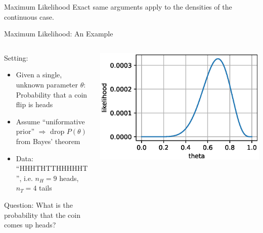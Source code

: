 {\begin{frame}{Maximum Likelihood}
        Exact same arguments apply to the densities of the continuous case.
    \end{frame}

    \begin{frame}{Maximum Likelihood: An Example}
        \begin{columns}[onlytextwidth]
            \begin{column}{0.7\textwidth}
                Setting:
                \begin{itemize}
                    \item Given a single, unknown parameter $\theta$: Probability that a coin flip is heads
                    \item Assume ``uniformative prior'' $\Rightarrow$ drop $P(\theta)$ from Bayes' theorem
                    \item Data: ``HHHTHTTHHHHHT'', i.e. $n_H = 9$ heads, $n_T = 4$ tails
                \end{itemize}
                \vspace*{3mm}

                Question: What is the probability that the coin comes up heads?\\
            \end{column}
            \begin{column}{0.3\textwidth}
                \begin{center}
                    \includegraphics[width=\textwidth]{fig/prob_mle.eps}
                \end{center}
            \end{column}
        \end{columns}


\end{frame}}
